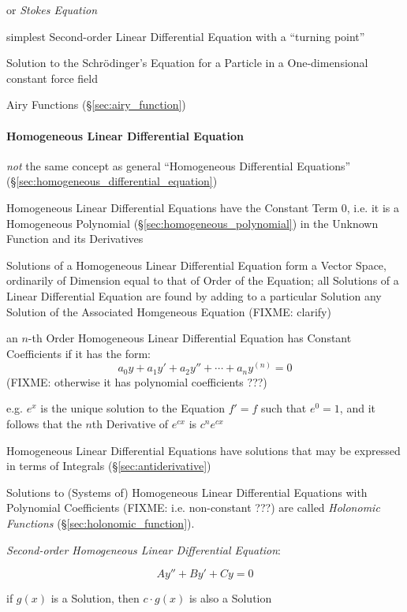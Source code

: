 {or \emph{Stokes Equation}

simplest Second-order Linear Differential Equation with a ``turning point''

Solution to the Schr\"odinger's Equation for a Particle in a One-dimensional
constant force field

Airy Functions (\S\ref{sec:airy_function})



\paragraph{Homogeneous Linear Differential Equation}
\label{sec:homogeneous_linear_differential}\hfill

\emph{not} the same concept as general ``Homogeneous Differential Equations''
(\S\ref{sec:homogeneous_differential_equation})

Homogeneous Linear Differential Equations have the Constant Term $0$, i.e. it
is a Homogeneous Polynomial (\S\ref{sec:homogeneous_polynomial}) in the Unknown
Function and its Derivatives

Solutions of a Homogeneous Linear Differential Equation form a Vector Space,
ordinarily of Dimension equal to that of Order of the Equation; all Solutions
of a Linear Differential Equation are found by adding to a particular Solution
any Solution of the Associated Homgeneous Equation (FIXME: clarify)

an $n$-th Order Homogeneous Linear Differential Equation has Constant
Coefficients if it has the form:
\[
  a_0y + a_1y' + a_2y'' + \cdots + a_ny^{(n)} = 0
\]
(FIXME: otherwise it has polynomial coefficients ???)

e.g. $e^x$ is the unique solution to the Equation $f' = f$ such that $e^0 = 1$,
and it follows that the $n$th Derivative of $e^{cx}$ is $c^n e^{cx}$

Homogeneous Linear Differential Equations have solutions that may be expressed
in terms of Integrals (\S\ref{sec:antiderivative})

Solutions to (Systems of) Homogeneous Linear Differential Equations with
Polynomial Coefficients (FIXME: i.e. non-constant ???) are called
\emph{Holonomic Functions} (\S\ref{sec:holonomic_function}).

\emph{Second-order Homogeneous Linear Differential Equation}:

\[
  A y'' + B y' + C y = 0
\]

if $g(x)$ is a Solution, then $c\cdot{g(x)}$ is also a Solution

}

